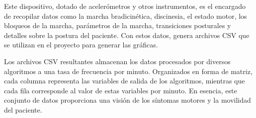 Este dispositivo, dotado de acelerómetros y otros instrumentos, es el encargado de recopilar datos como la marcha bradicinética, discinesia, el estado motor, los bloqueos de la marcha, parámetros de la marcha, transiciones posturales y detalles sobre la postura del paciente. Con estos datos, genera archivos CSV que se utilizan en el proyecto para generar las gráficas.

Los archivos CSV resultantes almacenan los datos procesados por diversos algoritmos a una tasa de frecuencia por minuto. Organizados en forma de matriz, cada columna representa las variables de salida de los algoritmos, mientras que cada fila corresponde al valor de estas variables por minuto. En esencia, este conjunto de datos proporciona una visión de los síntomas motores y la movilidad del paciente.

